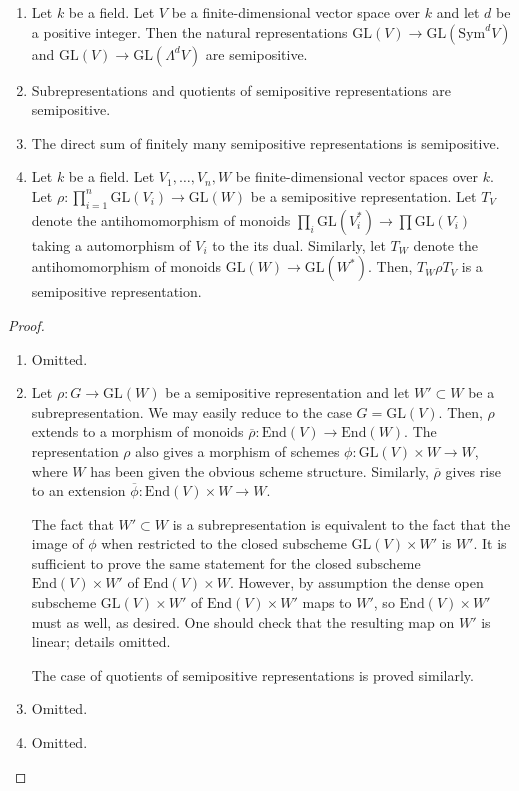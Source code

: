 \begin{lemma}
\label{semipos_rep_examples}
\begin{enumerate}
\item\label{sym_and_wedge_semipos} Let $k$ be a field.
Let $V$ be a finite-dimensional vector space over $k$ and let $d$ be a positive
integer.
Then the natural representations
$\mathrm{GL}(V) \to \mathrm{GL}(\mathrm{Sym}^dV)$ and
$\mathrm{GL}(V) \to \mathrm{GL}(\Lambda^dV)$
are semipositive.
\item\label{subreps_and_quotients_semipos} Subrepresentations and quotients of
  semipositive representations are semipositive.
\item The direct sum of finitely many semipositive representations is
  semipositive.
\item
Let $k$ be a field.
Let $V_1,\ldots,V_n,W$ be finite-dimensional vector spaces over $k$.
Let $\rho:\prod_{i=1}^{n}\mathrm{GL}(V_i)\rightarrow \mathrm{GL}(W)$ be a
semipositive representation.
Let $T_V$ denote the antihomomorphism of monoids
$\prod_i\mathrm{GL}(V_i^*)\to\prod\mathrm{GL}(V_i)$ taking a automorphism of
$V_i$ to the its dual.
Similarly, let $T_W$ denote the antihomomorphism of monoids
$\mathrm{GL}(W)\to\mathrm{GL}(W^*)$.
Then, $T_W\rho T_V$ is a semipositive representation.
\end{enumerate}
\end{lemma}

\begin{proof}
\begin{enumerate}
\item Omitted.
\item Let $\rho:G\to \mathrm{GL}(W)$ be a semipositive representation and let
$W'\subset W$ be a subrepresentation.
We may easily reduce to the case $G=\mathrm{GL}(V)$.
Then, $\rho$ extends to a morphism of monoids
$\overline{\rho}:\mathrm{End}(V)\to \mathrm{End}(W)$.
The representation $\rho$ also gives a morphism of schemes
$\phi:\mathrm{GL}(V)\times W\to W$, where $W$ has been given the obvious scheme
structure.
Similarly, $\overline{\rho}$ gives rise to an extension
$\overline{\phi}:\mathrm{End}(V)\times W\to W$.

The fact that $W'\subset W$ is a subrepresentation is equivalent to the fact
that the image of $\phi$ when restricted to the closed subscheme
$\mathrm{GL}(V)\times W'$ is $W'$.
It is sufficient to prove the same statement for the closed subscheme
$\mathrm{End}(V)\times W'$ of $\mathrm{End}(V)\times W$.
However, by assumption the dense open subscheme $\mathrm{GL}(V)\times W'$ of
$\mathrm{End}(V)\times W'$ maps to $W'$, so $\mathrm{End}(V)\times W'$ must as
well, as desired. One should check that the resulting map on $W'$ is linear;
details omitted.

The case of quotients of semipositive representations is proved similarly.
\item Omitted.
\item Omitted.
\end{enumerate}
\end{proof}


